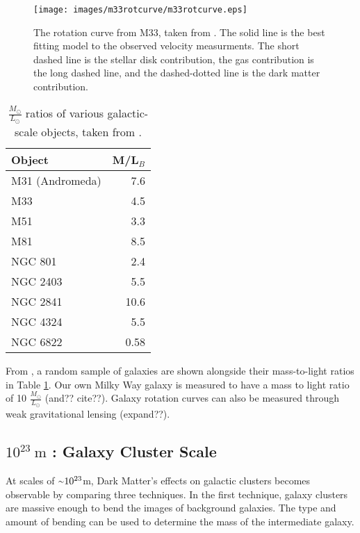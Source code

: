     \begin{figure}[ht]
      \texttt{[image: images/m33rotcurve/m33rotcurve.eps]}
      \caption[M33 Rotation Curve]{
        The rotation curve from M33, taken from \cite{m33rotcurve}.
        The solid line is the best fitting model to the observed velocity measurments.
        The short dashed line is the stellar disk contribution, the gas contribution is the long dashed line, and the dashed-dotted line is the dark matter contribution.
      }
      \label{fig:m33rotcurve}
    \end{figure}
    
    \begin{table}[]
      \centering
      \caption{$\frac{M_\odot}{L_\odot}$ ratios of various galactic-scale objects, taken from \cite{faber_ml}.}
      \label{tab:mlratios}
      \begin{tabular}{l r}
        Object          & M/L${}_{B}$ \\
        \hline
        M31 (Andromeda) &  7.6  \\
        M33             &  4.5  \\
        M51             &  3.3  \\
        M81             &  8.5  \\
        NGC 801         &  2.4  \\
        NGC 2403        &  5.5  \\
        NGC 2841        & 10.6  \\
        NGC 4324        &  5.5  \\
        NGC 6822        &  0.58 \\
      \end{tabular}
    \end{table}
      
    From \cite{faber_ml}, a random sample of galaxies are shown alongside their mass-to-light ratios in Table \ref{tab:mlratios}.
    Our own Milky Way galaxy is measured to have a mass to light ratio of 10 $\frac{M_{\odot}}{L_{\odot}}$ {\color{red}(and?? cite??)}.
    Galaxy rotation curves can also be measured through weak gravitational lensing \cite{weak_lensing_2001} {\color{red}(expand??)}.

  \subsection{$10^{23}\:\text{m}$ : Galaxy Cluster Scale}
    At scales of $\nicetilde 10^{23}$m, Dark Matter's effects on galactic clusters becomes observable by comparing three techniques.
    In the first technique, galaxy clusters are massive enough to bend the images of background galaxies.
    The type and amount of bending can be used to determine the mass of the intermediate galaxy.

